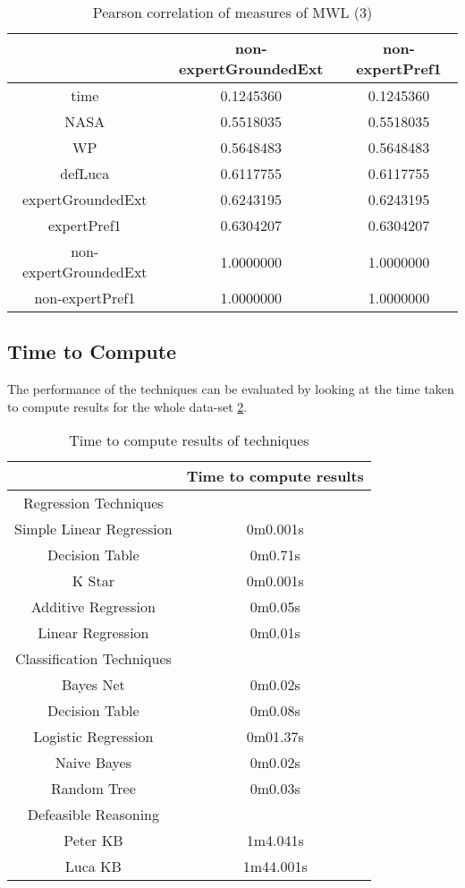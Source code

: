 \begin{table}[!htbp]
\centering
\begin{tabular}{|c|c|c|}
\hline
                 & non-expertGroundedExt & non-expertPref1 \\ \hline
time                & 0.1245360  & 0.1245360 \\
NASA                & 0.5518035  & 0.5518035 \\
WP                  & 0.5648483  & 0.5648483 \\
defLuca             & 0.6117755  & 0.6117755 \\
expertGroundedExt   & 0.6243195  & 0.6243195 \\
expertPref1         & 0.6304207  & 0.6304207 \\
non-expertGroundedExt & 1.0000000  & 1.0000000 \\
non-expertPref1       & 1.0000000  & 1.0000000 \\
\hline
\end{tabular}
\caption{Pearson correlation of measures of MWL (3)}
\label{tab:corrmwlthree}
\end{table}

\subsection{Time to Compute}

The performance of the techniques can be evaluated by looking at the time taken to compute results for the whole data-set \ref{tab:timeperformance}.

\begin{table}[!htbp]
\centering
\begin{tabular}{|c|c|}
\hline
 & Time to compute results \\ \hline
Regression Techniques & \\ \hline
Simple Linear Regression & 0m0.001s\\
Decision Table & 0m0.71s\\
K Star & 0m0.001s\\
Additive Regression & 0m0.05s\\
Linear Regression & 0m0.01s\\ \hline
Classification Techniques & \\ \hline
Bayes Net &0m0.02s \\
Decision Table & 0m0.08s\\  
Logistic Regression & 0m01.37s\\ 
Naive Bayes & 0m0.02s\\ 
Random Tree & 0m0.03s\\ \hline
Defeasible Reasoning & \\ \hline
Peter KB & 1m4.041s\\
Luca KB & 1m44.001s\\
\hline
\end{tabular}
\caption{Time to compute results of techniques}
\label{tab:timeperformance}
\end{table}

